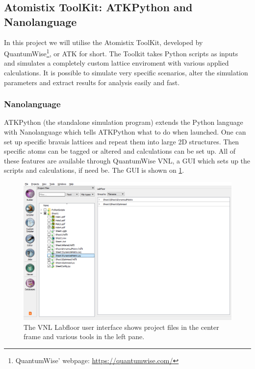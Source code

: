 
\subsection{Atomistix ToolKit: ATKPython and Nanolanguage}
In this project we will utilise the Atomistix ToolKit, developed by QuantumWise\footnote{QuantumWise' webpage: \href{https://quantumwise.com/}{https://quantumwise.com/}}, or ATK for short. The Toolkit takes Python scripts as inputs and simulates a completely custom lattice enviroment with various applied calculations. It is possible to simulate very specific scenarios, alter the simulation parameters and extract results for analysis easily and fast.
\subsubsection{Nanolanguage}
ATKPython (the standalone simulation program) extends the Python language with Nanolanguage which tells ATKPython what to do when launched. One can set up specific bravais lattices and repeat them into large 2D structures. Then specific atoms can be tagged or altered and calculations can be set up. All of these features are available through QuantumWise VNL, a GUI which sets up the scripts and calculations, if need be. The GUI is shown on \cref{VNLLAB}.
\begin{figure}
 \centering
 \includegraphics[width=\columnwidth]{Figures/VNLLabfloor.png}
 \caption{The VNL Labfloor user interface shows project files in the center frame and various tools in the left pane.}
 \label{VNLLAB}
\end{figure}
